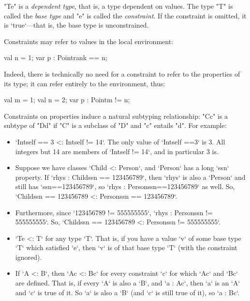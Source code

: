 {\xcd"T{e}" is a {\em dependent type}, that is, a type dependent on values. The
type \xcd"T" is called the {\em base type} and \xcd"e" is called the {\em
  constraint}. If the constraint is omitted, it is \xcd`true`---that is, the
  base type is unconstrained.

Constraints may refer to values in the local environment: 
\begin{xten}
     val n = 1;
     var p : Point{rank == n};
\end{xten}
Indeed, there is technically no need for a constraint to refer to the
properties of its type; it can refer entirely to the environment, thus: 
\begin{xten}
     val m = 1;
     val n = 2;
     var p : Point{m != n};
\end{xten}

Constraints on properties induce a natural subtyping relationship:
\xcd"C{c}" is a subtype of
\xcd"D{d}" if \xcd"C" is a subclass of \xcd"D" and
\xcd"c" entails \xcd"d".
For example: 
\begin{itemize}
\item \xcd`Int{self == 3} <: Int{self != 14}`.  The only value of
      \xcd`Int{self ==3}` is 3.  All integers but 14 are members of
      \xcd`Int{self != 14}`, and in particular 3 is.  
\item Suppose we have classes \xcd`Child <: Person`, and \xcd`Person` has a
      long \xcd`ssn` property.  If \xcd`rhys : Child{ssn == 123456789}`, then
      \xcd`rhys` is also a \xcd`Person` and still has \xcd`ssn==123456789`, so 
      \xcd`rhys : Person{ssn==123456789}` as well.  
      So, \xcd`Child{ssn == 123456789} <: Person{ssn == 123456789}`.
\item Furthermore, since \xcd`123456789 != 555555555`, 
      \xcd`rhys : Person{ssn != 555555555}`.  
      So, \xcd`Child{ssn == 123456789} <: Person{ssn != 555555555}`.  
\item \xcd`T{e} <: T` for any type \xcd`T`.  That is, if you have a value
      \xcd`v` of some base type \xcd`T` which satisfied \xcd`e`, then \xcd`v`
      is of that base type \xcd`T` (with the constraint ignored).
\item If \xcd`A <: B`, then \xcd`A{c} <: B{c}` for every constraint \xcd`{c}`
      for which \xcd`A{c}` and \xcd`B{c}` are defined.  That is, if every
      \xcd`A` is also a \xcd`B`, and \xcd`a : A{c}`, then 
      \xcd`a` is an \xcd`A` and \xcd`c` is true of it. So \xcd`a` is also a
      \xcd`B` (and \xcd`c` is still true of 
      it), so \xcd`a : B{c}`.  


\end{itemize}}
